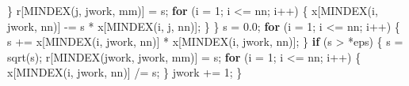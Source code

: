 \documentclass[
  12pt,
  letterpaper,
  DIV=11,
  numbers=noendperiod]{scrreprt}
\newenvironment{Shaded}{\begin{snugshade}}{\end{snugshade}}
\newcommand{\ControlFlowTok}[1]{\textcolor[rgb]{0.00,0.23,0.31}{\textbf{#1}}}
\newcommand{\DecValTok}[1]{\textcolor[rgb]{0.68,0.00,0.00}{#1}}
\newcommand{\FloatTok}[1]{\textcolor[rgb]{0.68,0.00,0.00}{#1}}
\newcommand{\NormalTok}[1]{\textcolor[rgb]{0.00,0.23,0.31}{#1}}
\newcommand{\OperatorTok}[1]{\textcolor[rgb]{0.37,0.37,0.37}{#1}}
\theoremstyle{remark}
\begin{document}
\begin{Shaded}
\begin{Highlighting}[]
            \OperatorTok{\}}
\NormalTok{            r}\OperatorTok{[}\NormalTok{MINDEX}\OperatorTok{(}\NormalTok{j}\OperatorTok{,}\NormalTok{ jwork}\OperatorTok{,}\NormalTok{ mm}\OperatorTok{)]} \OperatorTok{=}\NormalTok{ s}\OperatorTok{;}
            \ControlFlowTok{for} \OperatorTok{(}\NormalTok{i }\OperatorTok{=} \DecValTok{1}\OperatorTok{;}\NormalTok{ i }\OperatorTok{\textless{}=}\NormalTok{ nn}\OperatorTok{;}\NormalTok{ i}\OperatorTok{++)} \OperatorTok{\{}
\NormalTok{                x}\OperatorTok{[}\NormalTok{MINDEX}\OperatorTok{(}\NormalTok{i}\OperatorTok{,}\NormalTok{ jwork}\OperatorTok{,}\NormalTok{ nn}\OperatorTok{)]} \OperatorTok{{-}=}\NormalTok{ s }\OperatorTok{*}\NormalTok{ x}\OperatorTok{[}\NormalTok{MINDEX}\OperatorTok{(}\NormalTok{i}\OperatorTok{,}\NormalTok{ j}\OperatorTok{,}\NormalTok{ nn}\OperatorTok{)];}
            \OperatorTok{\}}
        \OperatorTok{\}}
\NormalTok{        s }\OperatorTok{=} \FloatTok{0.0}\OperatorTok{;}
        \ControlFlowTok{for} \OperatorTok{(}\NormalTok{i }\OperatorTok{=} \DecValTok{1}\OperatorTok{;}\NormalTok{ i }\OperatorTok{\textless{}=}\NormalTok{ nn}\OperatorTok{;}\NormalTok{ i}\OperatorTok{++)} \OperatorTok{\{}
\NormalTok{            s }\OperatorTok{+=}\NormalTok{ x}\OperatorTok{[}\NormalTok{MINDEX}\OperatorTok{(}\NormalTok{i}\OperatorTok{,}\NormalTok{ jwork}\OperatorTok{,}\NormalTok{ nn}\OperatorTok{)]} \OperatorTok{*}\NormalTok{ x}\OperatorTok{[}\NormalTok{MINDEX}\OperatorTok{(}\NormalTok{i}\OperatorTok{,}\NormalTok{ jwork}\OperatorTok{,}\NormalTok{ nn}\OperatorTok{)];}
        \OperatorTok{\}}
        \ControlFlowTok{if} \OperatorTok{(}\NormalTok{s }\OperatorTok{\textgreater{}} \OperatorTok{*}\NormalTok{eps}\OperatorTok{)} \OperatorTok{\{}
\NormalTok{            s }\OperatorTok{=}\NormalTok{ sqrt}\OperatorTok{(}\NormalTok{s}\OperatorTok{);}
\NormalTok{            r}\OperatorTok{[}\NormalTok{MINDEX}\OperatorTok{(}\NormalTok{jwork}\OperatorTok{,}\NormalTok{ jwork}\OperatorTok{,}\NormalTok{ mm}\OperatorTok{)]} \OperatorTok{=}\NormalTok{ s}\OperatorTok{;}
            \ControlFlowTok{for} \OperatorTok{(}\NormalTok{i }\OperatorTok{=} \DecValTok{1}\OperatorTok{;}\NormalTok{ i }\OperatorTok{\textless{}=}\NormalTok{ nn}\OperatorTok{;}\NormalTok{ i}\OperatorTok{++)} \OperatorTok{\{}
\NormalTok{                x}\OperatorTok{[}\NormalTok{MINDEX}\OperatorTok{(}\NormalTok{i}\OperatorTok{,}\NormalTok{ jwork}\OperatorTok{,}\NormalTok{ nn}\OperatorTok{)]} \OperatorTok{/=}\NormalTok{ s}\OperatorTok{;}
            \OperatorTok{\}}
\NormalTok{            jwork }\OperatorTok{+=} \DecValTok{1}\OperatorTok{;}
        \OperatorTok{\}}

\end{Highlighting}
\end{Shaded}
\end{document}
